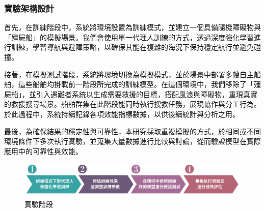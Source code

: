 \documentclass[12pt,a4paper]{article}
\begin{document}
\subsubsection{實驗架構設計}
首先，在訓練階段中，系統將環境設置為訓練模式，並建立一個具備隨機障礙物與「殭屍船」的模擬場景。我們會使用單一代理人訓練的方式，透過深度強化學習進行訓練，學習導航與避障策略，以確保其能在複雜的海況下保持穩定航行並避免碰撞。
\\ \par
接著，在模擬測試階段，系統將環境切換為模擬模式，並於場景中部署多艘自主船舶，這些船舶均掛載前一階段所完成的訓練模型。在這個環境中，我們移除了「殭屍船」，並引入遇難者系統以生成需要救援的目標，搭配風浪與障礙物，重現真實的救援搜尋場景。船舶群集在此階段能同時執行搜救任務，展現協作與分工行為。於此過程中，系統持續記錄各項效能指標數據，以供後續統計與分析之用。
\\ \par
最後，為確保結果的穩定性與可靠性，本研究採取重複模擬的方式，於相同或不同環境條件下多次執行實驗，並蒐集大量數據進行比較與討論，從而驗證模型在實際應用中的可靠性與效能。

\vspace*{4cm}
\begin{figure}[h]
    \centering
    \begin{minipage}[t]{1\textwidth}
        \centering
        \includegraphics[width=\textwidth]{image/TrainingArch.png}
        \caption{實驗階段}
    \end{minipage}
\end{figure}

\newpage
\end{document}
